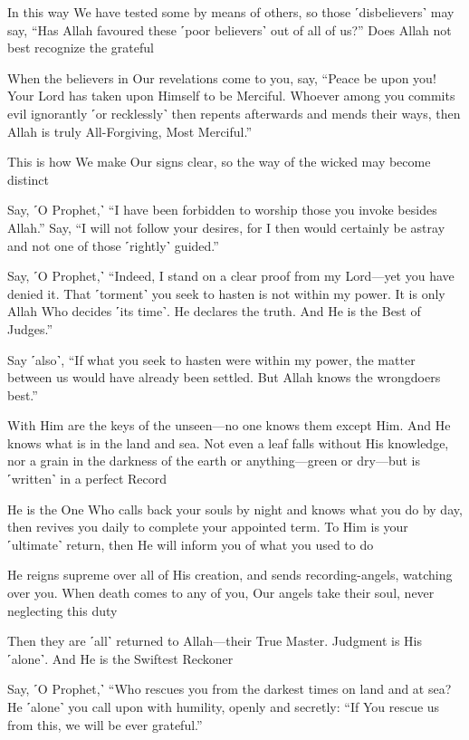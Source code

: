 In this way We have tested some by means of others, so those ˹disbelievers˺ may say, “Has Allah favoured these ˹poor believers˺ out of all of us?” Does Allah not best recognize the grateful

When the believers in Our revelations come to you, say, “Peace be upon you! Your Lord has taken upon Himself to be Merciful. Whoever among you commits evil ignorantly ˹or recklessly˺ then repents afterwards and mends their ways, then Allah is truly All-Forgiving, Most Merciful.”

This is how We make Our signs clear, so the way of the wicked may become distinct

Say, ˹O Prophet,˺ “I have been forbidden to worship those you invoke besides Allah.” Say, “I will not follow your desires, for I then would certainly be astray and not one of those ˹rightly˺ guided.”

Say, ˹O Prophet,˺ “Indeed, I stand on a clear proof from my Lord—yet you have denied it. That ˹torment˺ you seek to hasten is not within my power. It is only Allah Who decides ˹its time˺. He declares the truth. And He is the Best of Judges.”

Say ˹also˺, “If what you seek to hasten were within my power, the matter between us would have already been settled. But Allah knows the wrongdoers best.”

With Him are the keys of the unseen—no one knows them except Him. And He knows what is in the land and sea. Not even a leaf falls without His knowledge, nor a grain in the darkness of the earth or anything—green or dry—but is ˹written˺ in a perfect Record

He is the One Who calls back your souls by night and knows what you do by day, then revives you daily to complete your appointed term. To Him is your ˹ultimate˺ return, then He will inform you of what you used to do

He reigns supreme over all of His creation, and sends recording-angels, watching over you. When death comes to any of you, Our angels take their soul, never neglecting this duty

Then they are ˹all˺ returned to Allah—their True Master. Judgment is His ˹alone˺. And He is the Swiftest Reckoner

Say, ˹O Prophet,˺ “Who rescues you from the darkest times on land and at sea? He ˹alone˺ you call upon with humility, openly and secretly: “If You rescue us from this, we will be ever grateful.”

